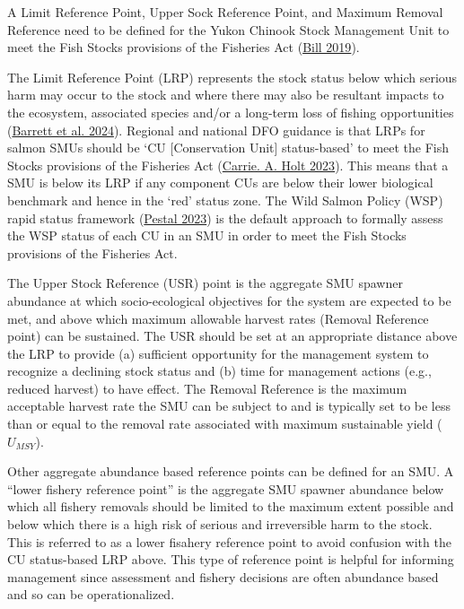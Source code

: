 \documentclass[11pt]{book}
\begin{document}
A Limit Reference Point, Upper Sock Reference Point, and Maximum Removal Reference need to be defined for the Yukon Chinook Stock Management Unit to meet the Fish Stocks provisions of the Fisheries Act (\protect\hyperlink{ref-bill201968}{Bill 2019}).

The Limit Reference Point (LRP) represents the stock status below which serious harm may occur to the stock and where there may also be resultant impacts to the ecosystem, associated species and/or a long-term loss of fishing opportunities (\protect\hyperlink{ref-barrett2024technical}{Barrett et al. 2024}). Regional and national DFO guidance is that LRPs for salmon SMUs should be `CU {[}Conservation Unit{]} status-based' to meet the Fish Stocks provisions of the Fisheries Act (\protect\hyperlink{ref-holt2023guidelines}{Carrie. A. Holt 2023}). This means that a SMU is below its LRP if any component CUs are below their lower biological benchmark and hence in the `red' status zone. The Wild Salmon Policy (WSP) rapid status framework (\protect\hyperlink{ref-pestal2023state}{Pestal 2023}) is the default approach to formally assess the WSP status of each CU in an SMU in order to meet the Fish Stocks provisions of the Fisheries Act.

The Upper Stock Reference (USR) point is the aggregate SMU spawner abundance at which socio-ecological objectives for the system are expected to be met, and above which maximum allowable harvest rates (Removal Reference point) can be sustained. The USR should be set at an appropriate distance above the LRP to provide (a) sufficient opportunity for the management system to recognize a declining stock status and (b) time for management actions (e.g., reduced harvest) to have effect. The Removal Reference is the maximum acceptable harvest rate the SMU can be subject to and is typically set to be less than or equal to the removal rate associated with maximum sustainable yield (\(U_{MSY}\)).

Other aggregate abundance based reference points can be defined for an SMU. A ``lower fishery reference point'' is the aggregate SMU spawner abundance below which all fishery removals should be limited to the maximum extent possible and below which there is a high risk of serious and irreversible harm to the stock. This is referred to as a lower fisahery reference point to avoid confusion with the CU status-based LRP above. This type of reference point is helpful for informing management since assessment and fishery decisions are often abundance based and so can be operationalized.
\end{document}
